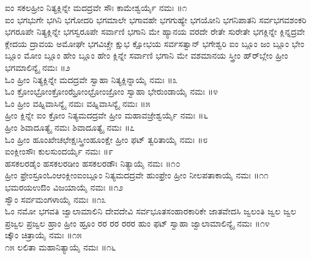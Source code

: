  ಐಂ ಸಕಲಹ್ರೀಂ ನಿತ್ಯಕ್ಲಿನ್ನೇ ಮದದ್ರವೇ ಸೌಃ  ಕಾಮೇಶ್ವರ್ಯೈ ನಮಃ ॥೧\\
 ಐಂ ಭಗಭುಗೇ ಭಗಿನಿ ಭಗೋದರಿ ಭಗಮಾಲೇ ಭಗಾವಹೇ ಭಗಗುಹ್ಯೇ ಭಗಯೋನಿ ಭಗನಿಪಾತನಿ ಸರ್ವಭಗವಶಂಕರಿ ಭಗರೂಪೇ ನಿತ್ಯಕ್ಲಿನ್ನೇ ಭಗಸ್ವರೂಪೇ ಸರ್ವಾಣಿ ಭಗಾನಿ ಮೇ ಹ್ಯಾನಯ ವರದೇ ರೇತೇ ಸುರೇತೇ ಭಗಕ್ಲಿನ್ನೇ ಕ್ಲಿನ್ನದ್ರವೇ ಕ್ಲೇದಯ ದ್ರಾವಯ ಅಮೋಘೇ ಭಗವಿಚ್ಚೇ ಕ್ಷುಭ ಕ್ಷೋಭಯ ಸರ್ವಸತ್ವಾನ್ ಭಗೇಶ್ವರಿ ಐಂ ಬ್ಲೂಂ ಜಂ ಬ್ಲೂಂ ಭೇಂ ಬ್ಲೂಂ ಮೋಂ ಬ್ಲೂಂ ಹೇಂ ಬ್ಲೂಂ ಹೇಂ ಕ್ಲಿನ್ನೇ ಸರ್ವಾಣಿ ಭಗಾನಿ ಮೇ ವಶಮಾನಯ ಸ್ತ್ರೀಂ ಹ್‌ರ್‌ಬ್ಲೇಂ ಹ್ರೀಂ  ಭಗಮಾಲಿನ್ಯೈ ನಮಃ ॥೨\\
 ಓಂ ಹ್ರೀಂ ನಿತ್ಯಕ್ಲಿನ್ನೇ ಮದದ್ರವೇ ಸ್ವಾಹಾ  ನಿತ್ಯಕ್ಲಿನ್ನಾಯೈ ನಮಃ ॥೩\\
 ಓಂ ಕ್ರೋಂಭ್ರೋಂಕ್ರೋಂಝ್ರೋಂಛ್ರೋಂಜ್ರೋಂ ಸ್ವಾಹಾ  ಭೇರುಂಡಾಯೈ ನಮಃ ॥೪\\
 ಓಂ ಹ್ರೀಂ ವಹ್ನಿವಾಸಿನ್ಯೈ ನಮಃ  ವಹ್ನಿವಾಸಿನ್ಯೈ ನಮಃ ॥೫\\
 ಹ್ರೀಂ ಕ್ಲಿನ್ನೇ ಐಂ ಕ್ರೋಂ ನಿತ್ಯಮದದ್ರವೇ ಹ್ರೀಂ  ಮಹಾವಜ್ರೇಶ್ವರ್ಯೈ ನಮಃ ॥೬\\
 ಹ್ರೀಂ ಶಿವಾದೂತ್ಯೈ ನಮಃ  ಶಿವಾದೂತ್ಯೈ ನಮಃ ॥೭\\
 ಓಂ ಹ್ರೀಂ ಹೂಂಖೇಚಛೇಕ್ಷಃಸ್ತ್ರೀಂಹೂಂಕ್ಷೇ ಹ್ರೀಂ ಫಟ್  ತ್ವರಿತಾಯೈ ನಮಃ ॥೮\\
 ಐಂಕ್ಲೀಂಸೌಃ  ಕುಲಸುಂದರ್ಯೈ ನಮಃ ॥೯\\
 ಹಸಕಲರಡೈಂ ಹಸಕಲರಡೀಂ ಹಸಕಲರಡೌಃ  ನಿತ್ಯಾಯೈ ನಮಃ ॥೧೦\\
 ಹ್ರೀಂ ಫ್ರೇಂಸ್ರೂಂಓಂಆಂಕ್ಲೀಂಐಂಬ್ಲೂಂ ನಿತ್ಯಮದದ್ರವೇ ಹುಂಫ್ರೇಂ ಹ್ರೀಂ  ನೀಲಪತಾಕಾಯೈ ನಮಃ ॥೧೧\\
 ಭಮರಯಉಔಂ  ವಿಜಯಾಯೈ ನಮಃ ॥೧೨\\
 ಸ್ವೌಂ  ಸರ್ವಮಂಗಳಾಯೈ ನಮಃ ॥೧೩\\
 ಓಂ ನಮೋ ಭಗವತಿ ಜ್ವಾಲಾಮಾಲಿನಿ ದೇವದೇವಿ ಸರ್ವಭೂತಸಂಹಾರಕಾರಿಕೇ ಜಾತವೇದಸಿ ಜ್ವಲಂತಿ ಜ್ವಲ ಜ್ವಲ ಪ್ರಜ್ವಲ ಪ್ರಜ್ವಲ ಹ್ರಾಂ ಹ್ರೀಂ ಹ್ರೂಂ ರರ ರರ ರರರ ಹುಂ ಫಟ್ ಸ್ವಾಹಾ  ಜ್ವಾಲಾಮಾಲಿನ್ಯೈ ನಮಃ ॥೧೪\\
 ಚ್ಕೌಂ  ಚಿತ್ರಾಯೈ ನಮಃ ॥೧೫\\
 ೧೫  ಲಲಿತಾ ಮಹಾನಿತ್ಯಾಯೈ ನಮಃ ॥೧೬

